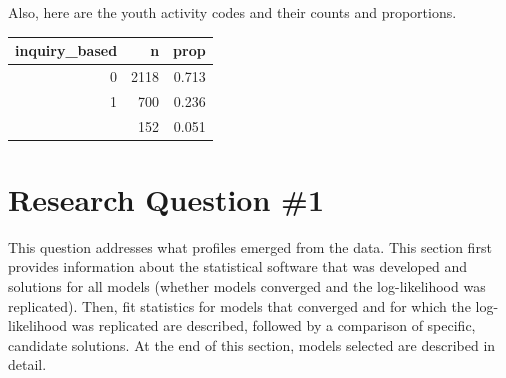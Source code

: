 \documentclass[]{book}
\theoremstyle{definition}
\theoremstyle{definition}
\theoremstyle{definition}
\theoremstyle{remark}
\begin{document}
\begin{table}

\caption{\label{tab:unnamed-chunk-10}Descriptive statistics for continuous study variables}
\centering
{}
\end{table}

Also, here are the youth activity codes and their counts and
proportions.

\begin{tabular}{rrr}
\toprule
inquiry\_based & n & prop\\
\midrule
0 & 2118 & 0.713\\
1 & 700 & 0.236\\
 & 152 & 0.051\\
\bottomrule
\end{tabular}

\section{Research Question \#1}\label{research-question-1}

This question addresses what profiles emerged from the data. This
section first provides information about the statistical software that
was developed and solutions for all models (whether models converged and
the log-likelihood was replicated). Then, fit statistics for models that
converged and for which the log-likelihood was replicated are described,
followed by a comparison of specific, candidate solutions. At the end of
this section, models selected are described in detail.
\end{document}
